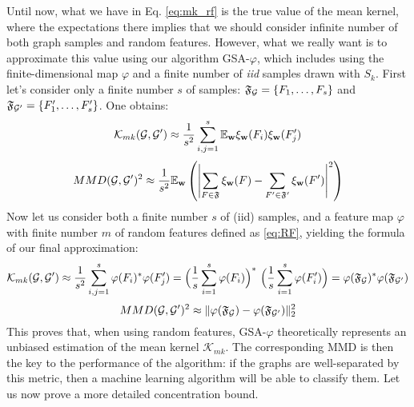Until now, what we have in Eq. \ref{eq:mk_rf} is the true value of the mean kernel, where the expectations there implies that we should consider infinite number of both graph samples and random features. However, what we really want is to approximate this value using our algorithm GSA-$\varphi$, which includes  using the finite-dimensional map $\varphi$ and a finite number of \emph{iid} samples drawn with $S_k$. First let's consider only a finite number $s$ of samples: $\mathfrak{F}_{\mathcal{G}}=\{F_1, \ldots, F_s\}$ and $\mathfrak{F}_{\mathcal{G}'}=\{F'_1, \ldots, F'_s\}$. One obtains: 
\begin{equation}
\label{eq:MK_samples}
\mathcal{K}_{mk}(\mathcal{G},\mathcal{G}') \approx \frac{1}{s^2} \sum_{i,j=1}^s \mathbb{E}_\mathbf{w} \xi_\mathbf{w}(F_i)\xi_\mathbf{w}(F'_j)
\end{equation}
\[
MMD(\mathcal{G},\mathcal{G}')^2 \approx \frac{1}{s^2}\mathbb{E}_\mathbf{w} \left( \left|\sum_{F\in\mathfrak{F}} \xi_\mathbf{w}(F) - \sum_{F'\in\mathfrak{F}'} \xi_\mathbf{w}(F') \right|^2 \right)
\]
Now let us consider both a finite number $s$ of (iid) samples, and a feature map $\varphi$ with finite number $m$ of random features defined as \eqref{eq:RF}, yielding the formula of our final approximation:
\begin{equation}
\label{eq:mean_kernel_RF}
\mathcal{K}_{mk}(\mathcal{G},\mathcal{G}') \approx \frac{1}{s^2} \sum_{i,j=1}^s \varphi(F_i)^*\varphi(F_j')=\Big(\frac{1}{s}\sum_{i=1}^s\varphi(F_i)\Big)^*~\Big(\frac{1}{s}\sum_{i=1}^s\varphi(F_i')\Big) = {\varphi}(\mathfrak{F}_{\mathcal{G}})^* {\varphi}(\mathfrak{F}_{\mathcal{G}'})
\end{equation}
\[
MMD(\mathcal{G},\mathcal{G}')^2 \approx  \| {\varphi}(\mathfrak{F}_{\mathcal{G}}) - {\varphi}(\mathfrak{F}_{\mathcal{G}'}) \|_2^2 
\]
This proves that, when using random features, GSA-$\varphi$ theoretically represents an unbiased estimation of the mean kernel $\mathcal{K}_{mk}$. The corresponding MMD is then the key to the performance of the algorithm: if the graphs are well-separated by this metric, then a machine learning algorithm will be able to classify them.
%
Let us now prove a more detailed concentration bound.
